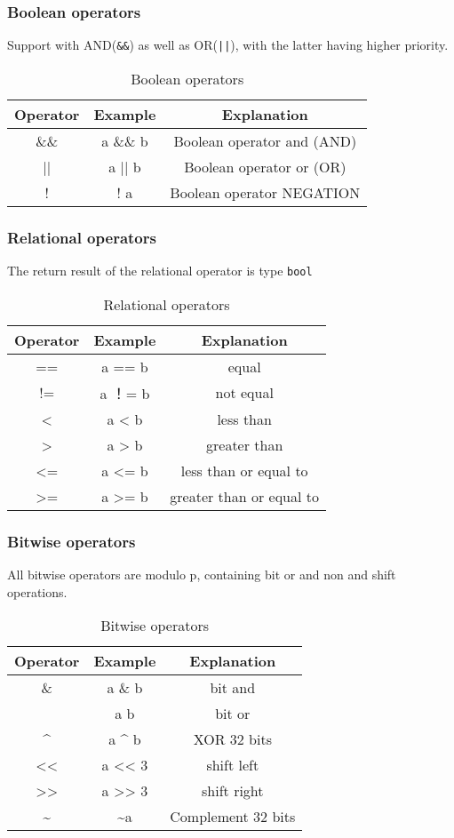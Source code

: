 \subsubsection*{Boolean operators}

Support with AND(\texttt{\&\&}) as well as OR(\texttt{||}), with the latter having higher priority.

\begin{table}
\centering
\begin{tabular}{c|c|c}
Operator & Example & Explanation \\ \hline
\&\& & a \&\& b & Boolean operator and (AND) \\
|| & a || b & Boolean operator or (OR) \\
! & ! a & Boolean operator NEGATION \\
\end{tabular}
\caption{Boolean operators}
\end{table}

\subsubsection*{Relational operators}

The return result of the relational operator is type \texttt{bool}

\begin{table}
\centering
\begin{tabular}{c|c|c}
Operator & Example & Explanation \\ \hline
== & a == b & equal \\
!= & a ！= b & not equal \\
< & a < b & less than \\
> & a > b & greater than \\
<= & a <= b & less than or equal to \\
>= & a >= b & greater than or equal to \\
\end{tabular}
\caption{Relational operators}
\end{table}

\subsubsection*{Bitwise operators}

All bitwise operators are modulo p, containing bit or and non and shift operations.
\begin{table}
\centering
\begin{tabular}{c|c|c}
    Operator & Example & Explanation \\ \hline
    \& & a \& b & bit and \\
    \textbar{} & a \textbar{} b & bit or \\
    \textasciicircum{} & a \textasciicircum{} b & XOR 32 bits \\
    << & a << 3 & shift left \\
    >> & a >> 3 & shift right \\
    \textasciitilde{} & \textasciitilde{}a & Complement 32  bits \\
\end{tabular}
\caption{Bitwise operators}
\end{table}

